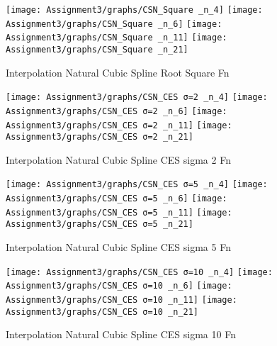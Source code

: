 \documentclass[]{article}
\begin{document}
\begin{figure}

{\centering \texttt{[image: Assignment3/graphs/CSN\_Square \_n\_4]} \texttt{[image: Assignment3/graphs/CSN\_Square \_n\_6]} \texttt{[image: Assignment3/graphs/CSN\_Square \_n\_11]} \texttt{[image: Assignment3/graphs/CSN\_Square \_n\_21]} 

}

\caption{Interpolation Natural Cubic Spline Root Square Fn}\label{fig:unnamed-chunk-8}
\end{figure}

\begin{figure}

{\centering \texttt{[image: Assignment3/graphs/CSN\_CES σ=2 \_n\_4]} \texttt{[image: Assignment3/graphs/CSN\_CES σ=2 \_n\_6]} \texttt{[image: Assignment3/graphs/CSN\_CES σ=2 \_n\_11]} \texttt{[image: Assignment3/graphs/CSN\_CES σ=2 \_n\_21]} 

}

\caption{Interpolation Natural Cubic Spline CES sigma 2 Fn}\label{fig:unnamed-chunk-9}
\end{figure}

\begin{figure}

{\centering \texttt{[image: Assignment3/graphs/CSN\_CES σ=5 \_n\_4]} \texttt{[image: Assignment3/graphs/CSN\_CES σ=5 \_n\_6]} \texttt{[image: Assignment3/graphs/CSN\_CES σ=5 \_n\_11]} \texttt{[image: Assignment3/graphs/CSN\_CES σ=5 \_n\_21]} 

}

\caption{Interpolation Natural Cubic Spline CES sigma 5 Fn}\label{fig:unnamed-chunk-10}
\end{figure}

\begin{figure}

{\centering \texttt{[image: Assignment3/graphs/CSN\_CES σ=10 \_n\_4]} \texttt{[image: Assignment3/graphs/CSN\_CES σ=10 \_n\_6]} \texttt{[image: Assignment3/graphs/CSN\_CES σ=10 \_n\_11]} \texttt{[image: Assignment3/graphs/CSN\_CES σ=10 \_n\_21]} 

}

\caption{Interpolation Natural Cubic Spline CES sigma 10 Fn}\label{fig:unnamed-chunk-11}
\end{figure}
\end{document}
